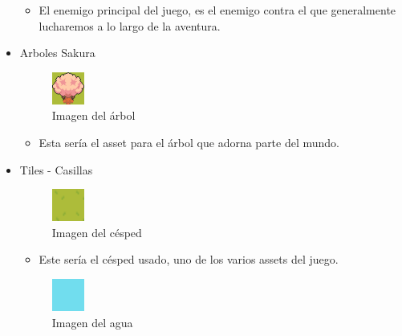 \documentclass[a4paper]{article}
\begin{document}
\begin{appendices}
\begin{itemize}
\begin{itemize}
                  \item El enemigo principal del juego, es el enemigo contra el que generalmente lucharemos a lo largo de la aventura.
              \end{itemize}
        \item Arboles Sakura
              \begin{figure}[ht]
                  \centering
                  \includegraphics[width=0.1\textwidth]{Images/arboles.png}
                  \caption{Imagen del árbol}
                  \label{fig:arbol}
              \end{figure}
              \begin{itemize}
                  \item Esta sería el asset para el árbol que adorna parte del mundo.
              \end{itemize}
              \clearpage
        \item Tiles - Casillas
              \begin{figure}[ht]
                  \centering
                  \includegraphics[width=0.1\textwidth]{Images/cesped1.png}
                  \caption{Imagen del césped}
                  \label{fig:cesped}
              \end{figure}
              \begin{itemize}
                  \item Este sería el césped usado, uno de los varios assets del juego.
              \end{itemize}
              \begin{figure}[ht]
                  \centering
                  \includegraphics[width=0.1\textwidth]{Images/agua.png}
                  \caption{Imagen del agua}
                  \label{fig:agua}
              \end{figure}
              \begin{itemize}

\end{itemize}
\end{itemize}
\end{appendices}
\end{document}
